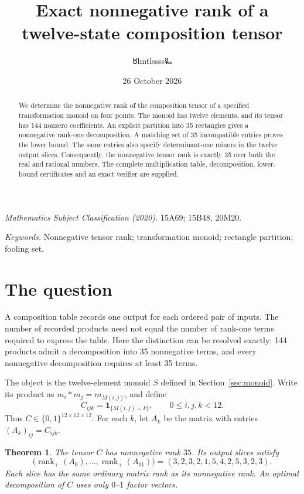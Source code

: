\documentclass[11pt,a4paper]{article}
\title{\LARGE Exact nonnegative rank of a\protect\\twelve-state composition tensor}
\author{{\authorsymbol 🜘}lmtlssss{\authorsymbol 🜐}}
\date{26 October 2026}
\newtheorem{theorem}{Theorem}
\theoremstyle{definition}
\DeclareMathOperator{\rank}{rank}
\newcommand{\ind}{\mathbf 1}
\begin{document}
\maketitle
\thispagestyle{plain}
\begin{abstract}
We determine the nonnegative rank of the composition tensor of a specified
transformation monoid on four points. The monoid has twelve elements, and
its tensor has 144 nonzero coefficients. An explicit partition into 35
rectangles gives a nonnegative rank-one decomposition. A matching set of
35 incompatible entries proves the lower bound. The same entries also
specify determinant-one minors in the twelve output slices. Consequently,
the nonnegative tensor rank is exactly 35 over both the real and rational
numbers. The complete multiplication table, decomposition, lower-bound
certificates and an exact verifier are supplied.
\end{abstract}

\noindent\textit{Mathematics Subject Classification (2020).}
15A69; 15B48, 20M20.\par
\noindent\textit{Keywords.} Nonnegative tensor rank; transformation monoid;
rectangle partition; fooling set.

\section{The question}

A composition table records one output for each ordered pair of inputs.
The number of recorded products need not equal the number of rank-one
terms required to express the table. Here the distinction can be resolved
exactly: 144 products admit a decomposition into 35 nonnegative terms,
and every nonnegative decomposition requires at least 35 terms.

The object is the twelve-element monoid $S$ defined in Section~\ref{sec:monoid}.
Write its product as $m_i*m_j=m_{M(i,j)}$, and define
\begin{equation}\label{eq:tensor}
 C_{ijk}=\ind_{\{M(i,j)=k\}},\qquad 0\leq i,j,k<12.
\end{equation}
Thus $C\in\{0,1\}^{12\times12\times12}$. For each $k$, let $A_k$ be the
matrix with entries $(A_k)_{ij}=C_{ijk}$.

\begin{theorem}\label{thm:main}
The tensor $C$ has nonnegative rank $35$. Its output slices satisfy
\begin{equation}\label{eq:ranks}
\bigl(\rank_+(A_0),\ldots,\rank_+(A_{11})\bigr)
=(3,2,3,2,1,5,4,2,5,3,2,3).
\end{equation}
Each slice has the same ordinary matrix rank as its nonnegative rank.
An optimal decomposition of $C$ uses only $0$--$1$ factor vectors.
\end{theorem}
\end{document}
